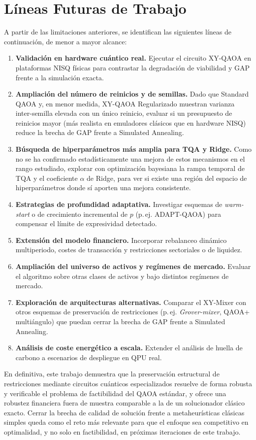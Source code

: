 \section{Líneas Futuras de Trabajo}
\label{sec:trabajo_futuro}

A partir de las limitaciones anteriores, se identifican las siguientes líneas de continuación, de menor a mayor
alcance:

\begin{enumerate}
    \item \textbf{Validación en hardware cuántico real.} Ejecutar el circuito XY-QAOA en plataformas NISQ
    físicas para contrastar la degradación de viabilidad y GAP frente a la simulación exacta.
    \item \textbf{Ampliación del número de reinicios y de semillas.} Dado que Standard QAOA y, en menor medida,
    XY-QAOA Regularizado muestran varianza inter-semilla elevada con un único reinicio, evaluar si un
    presupuesto de reinicios mayor (más realista en emuladores clásicos que en hardware NISQ) reduce la brecha
    de GAP frente a Simulated Annealing.
    \item \textbf{Búsqueda de hiperparámetros más amplia para TQA y Ridge.} Como no se ha confirmado
    estadísticamente una mejora de estos mecanismos en el rango estudiado, explorar con optimización bayesiana
    la rampa temporal de TQA y el coeficiente $\alpha$ de Ridge, para ver si existe una región del espacio de
    hiperparámetros donde sí aporten una mejora consistente.
    \item \textbf{Estrategias de profundidad adaptativa.} Investigar esquemas de \emph{warm-start} o de
    crecimiento incremental de $p$ (p.\,ej. ADAPT-QAOA) para compensar el límite de expresividad detectado.
    \item \textbf{Extensión del modelo financiero.} Incorporar rebalanceo dinámico multiperiodo, costes de
    transacción y restricciones sectoriales o de liquidez.
    \item \textbf{Ampliación del universo de activos y regímenes de mercado.} Evaluar el algoritmo sobre otras
    clases de activos y bajo distintos regímenes de mercado.
    \item \textbf{Exploración de arquitecturas alternativas.} Comparar el XY-Mixer con otros esquemas de
    preservación de restricciones (p.\,ej. \emph{Grover-mixer}, QAOA+ multiángulo) que puedan cerrar la brecha de
    GAP frente a Simulated Annealing.
    \item \textbf{Análisis de coste energético a escala.} Extender el análisis de huella de carbono a escenarios
    de despliegue en QPU real.
\end{enumerate}

En definitiva, este trabajo demuestra que la preservación estructural de restricciones mediante circuitos
cuánticos especializados resuelve de forma robusta y verificable el problema de factibilidad del QAOA estándar,
y ofrece una robustez financiera fuera de muestra comparable a la de un solucionador clásico exacto. Cerrar la
brecha de calidad de solución frente a metaheurísticas clásicas simples queda como el reto más relevante para
que el enfoque sea competitivo en optimalidad, y no solo en factibilidad, en próximas iteraciones de este
trabajo.